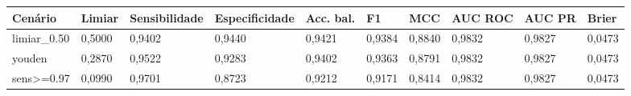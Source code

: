 \begin{tabular}{llllllllll}
\toprule
Cenário & Limiar & Sensibilidade & Especificidade & Acc. bal. & F1 & MCC & AUC ROC & AUC PR & Brier \\
\midrule
limiar_0.50 & 0,5000 & 0,9402 & 0,9440 & 0,9421 & 0,9384 & 0,8840 & 0,9832 & 0,9827 & 0,0473 \\
youden & 0,2870 & 0,9522 & 0,9283 & 0,9402 & 0,9363 & 0,8791 & 0,9832 & 0,9827 & 0,0473 \\
sens>=0.97 & 0,0990 & 0,9701 & 0,8723 & 0,9212 & 0,9171 & 0,8414 & 0,9832 & 0,9827 & 0,0473 \\
\bottomrule
\end{tabular}
